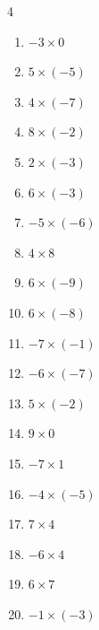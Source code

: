 \begin{multicols}{4}
\begin{enumerate}
  \item $-3\times 0$
        \phantom{$=0$}

  \item $5\times (-5)$
        \phantom{$=-25$}

  \item $4\times (-7)$
        \phantom{$=-28$}

  \item $8\times (-2)$
        \phantom{$=-16$}

  \item $2\times (-3)$
        \phantom{$=-6$}

  \item $6\times (-3)$
        \phantom{$=-18$}

  \item $-5\times (-6)$
        \phantom{$=30$}

  \item $4\times 8$
        \phantom{$=32$}

\columnbreak %

\resetques

  \item $6\times (-9)$
        \phantom{$=-54$}

  \item $6\times (-8)$
        \phantom{$=-48$}

  \item $-7\times (-1)$
        \phantom{$=7$}

  \item $-6\times (-7)$
        \phantom{$=42$}

  \item $5\times (-2)$
        \phantom{$=-10$}

  \item $9\times 0$
        \phantom{$=0$}

  \item $-7\times 1$
        \phantom{$=-7$}

  \item $-4\times (-5)$
        \phantom{$=20$}

  \item $7\times 4$
        \phantom{$=28$}

  \item $-6\times 4$
        \phantom{$=-24$}

  \item $6\times 7$
        \phantom{$=42$}

  \item $-1\times (-3)$
        \phantom{$=3$}


\end{enumerate}
\end{multicols}
